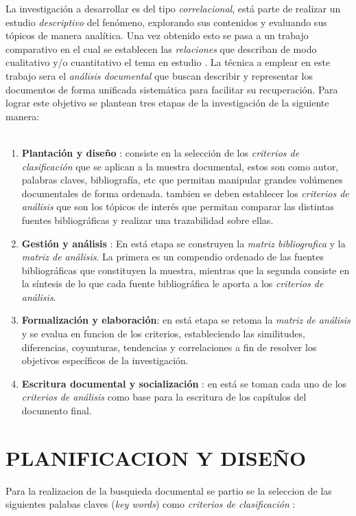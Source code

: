 \documentclass[12pt, letterpaper]{report}
\begin{document}
La investigación a desarrollar es del tipo \textit{correlacional}, está parte  de realizar un estudio \emph{descriptivo} del fenómeno,  explorando sus contenidos  y  evaluando  sus tópicos de manera analítica. Una vez obtenido  esto  se pasa a un trabajo comparativo  en el cual se establecen las    \textit{relaciones} que describan de modo cualitativo y/o cuantitativo  el tema en estudio . La técnica a emplear en este trabajo sera el \textit{análisis documental} que buscan describir y representar los documentos de forma unificada sistemática para facilitar su recuperación. 
Para lograr este objetivo se plantean tres etapas de la  investigación de la siguiente manera:\\\\
\begin{enumerate}
	\item\textbf{ Plantación  y diseño} : consiste en la selección  de los \textit{criterios  de clasificación } que se aplican a la muestra documental,  estos son como autor, palabras claves, bibliografía, etc que permitan manipular grandes volúmenes documentales de forma ordenada. tambien se deben establecer los \textit{criterios de análisis}  que son los tópicos de interés que permitan comparar las distintas fuentes  bibliográficas y realizar una trazabilidad sobre ellas.
	\item \textbf{Gestión y análisis} : En está etapa se  construyen la \textit{matriz bibliografica}  y la \textit{matriz de análisis}. La primera es un compendio ordenado de las fuentes bibliográficas que  constituyen la muestra, mientras que la segunda  consiste en la síntesis de lo que cada fuente bibliográfica le aporta  a los \textit{criterios de análisis}.  
	\item \textbf{Formalización y elaboración}: en está etapa se retoma la \textit{ matriz  de análisis }  y se evalua en funcion de los criterios, estableciendo las similitudes, diferencias, coyunturas,  tendencias y correlaciones  a fin de resolver los objetivos específicos de la investigación.
	\item \textbf{Escritura documental y socialización} :  en está se toman cada uno de los \textit{criterios de análisis } como base  para la escritura de los capítulos  del documento final.
\end{enumerate}

\section{PLANIFICACION Y DISEÑO}
Para la realizacion de la busquieda documental se partio se la seleccion de las siguientes palabas claves (\textit{key words}) como \textit{criterios de clasificación} :
\end{document}
